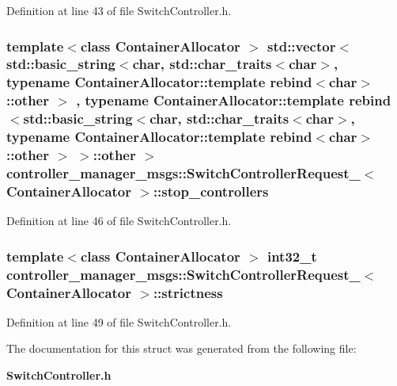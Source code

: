\-Definition at line 43 of file \-Switch\-Controller.\-h.

\subsubsection[{stop\-\_\-controllers}]{\setlength{\rightskip}{0pt plus 5cm}template$<$class Container\-Allocator $>$ std\-::vector$<$std\-::basic\-\_\-string$<$char, std\-::char\-\_\-traits$<$char$>$, typename \-Container\-Allocator\-::template rebind$<$char$>$\-::other $>$ , typename \-Container\-Allocator\-::template rebind$<$std\-::basic\-\_\-string$<$char, std\-::char\-\_\-traits$<$char$>$, typename \-Container\-Allocator\-::template rebind$<$char$>$\-::other $>$ $>$\-::other $>$ {\bf controller\-\_\-manager\-\_\-msgs\-::\-Switch\-Controller\-Request\-\_\-}$<$ \-Container\-Allocator $>$\-::{\bf stop\-\_\-controllers}}\label{structcontroller__manager__msgs_1_1SwitchControllerRequest___a8a7f1d68d29e5e6a90db31b78c6dfa34}


\-Definition at line 46 of file \-Switch\-Controller.\-h.

\subsubsection[{strictness}]{\setlength{\rightskip}{0pt plus 5cm}template$<$class Container\-Allocator $>$ int32\-\_\-t {\bf controller\-\_\-manager\-\_\-msgs\-::\-Switch\-Controller\-Request\-\_\-}$<$ \-Container\-Allocator $>$\-::{\bf strictness}}\label{structcontroller__manager__msgs_1_1SwitchControllerRequest___a7f8e3b99955863eb614e5963e3f71969}


\-Definition at line 49 of file \-Switch\-Controller.\-h.



\-The documentation for this struct was generated from the following file\-:\begin{DoxyCompactItemize}
\item 
{\bf \-Switch\-Controller.\-h}\end{DoxyCompactItemize}
